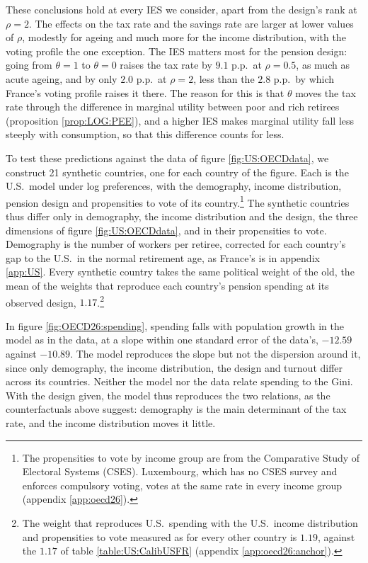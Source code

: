 These conclusions hold at every IES we consider, apart from the design's rank at $\rho = 2$. The effects on the tax rate and the savings rate are larger at lower values of $\rho$, modestly for ageing and much more for the income distribution, with the voting profile the one exception. The IES matters most for the pension design: going from $\theta = 1$ to $\theta = 0$ raises the tax rate by $9.1$ p.p.\ at $\rho = 0.5$, as much as acute ageing, and by only $2.0$ p.p.\ at $\rho = 2$, less than the $2.8$ p.p.\ by which France's voting profile raises it there. The reason for this is that $\theta$ moves the tax rate through the difference in marginal utility between poor and rich retirees (proposition \ref{prop:LOG:PEE}), and a higher IES makes marginal utility fall less steeply with consumption, so that this difference counts for less.


To test these predictions against the data of figure \ref{fig:US:OECDdata}, we construct 21 synthetic countries, one for each country of the figure. Each is the U.S.\ model under log preferences, with the demography, income distribution, pension design and propensities to vote of its country.\footnote{The propensities to vote by income group are from the Comparative Study of Electoral Systems (CSES). Luxembourg, which has no CSES survey and enforces compulsory voting, votes at the same rate in every income group (appendix \ref{app:oecd26}).} The synthetic countries thus differ only in demography, the income distribution and the design, the three dimensions of figure \ref{fig:US:OECDdata}, and in their propensities to vote. Demography is the number of workers per retiree, corrected for each country's gap to the U.S.\ in the normal retirement age, as France's is in appendix \ref{app:US}. Every synthetic country takes the same political weight of the old, the mean of the weights that reproduce each country's pension spending at its observed design, $1.17$.\footnote{The weight that reproduces U.S.\ spending with the U.S.\ income distribution and propensities to vote measured as for every other country is $1.19$, against the $1.17$ of table \ref{table:US:CalibUSFR} (appendix \ref{app:oecd26:anchor}).}

In figure \ref{fig:OECD26:spending}, spending falls with population growth in the model as in the data, at a slope within one standard error of the data's, $-12.59$ against $-10.89$. The model reproduces the slope but not the dispersion around it, since only demography, the income distribution, the design and turnout differ across its countries. Neither the model nor the data relate spending to the Gini. With the design given, the model thus reproduces the two relations, as the counterfactuals above suggest: demography is the main determinant of the tax rate, and the income distribution moves it little.

